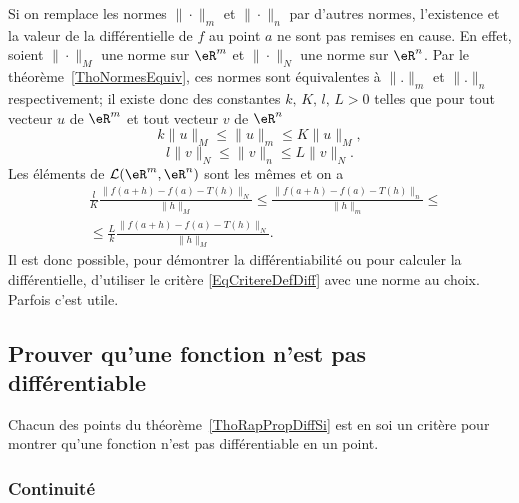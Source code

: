 \begin{remark}
	Si on remplace les normes \( \|\cdot\|_m\)  et \( \|\cdot\|_n\) par d'autres normes, l'existence et la valeur de la différentielle de \( f\) au point \( a\) ne sont pas remises en cause. En effet, soient  \( \|\cdot\|_M\)  une norme sur \( \eR^m\) et \( \|\cdot\|_N\) une norme sur \( \eR^n\). Par le théorème~\ref{ThoNormesEquiv}, ces normes sont équivalentes à \( \| . \|_m\) et \( \| . \|_n\) respectivement; il existe donc des constantes \( k,\, K,\, l,\,L >0\) telles que  pour tout vecteur \( u\) de \( \eR^m\) et tout vecteur \( v\) de \( \eR^n\)
	\[
		k\|u\|_M\leq \|u\|_m\leq K\|u\|_M,
	\]
	\[
		l\|v\|_N\leq \|v\|_n\leq L\|v\|_N.
	\]
	Les éléments de \( \mathcal{L}(\eR^m, \eR^n)\) sont les mêmes et on a
	\begin{equation}
		\begin{aligned}
			 & \frac{l}{K}  \frac{\|f(a+h)-f(a)-T(h)\|_N}{\|h\|_M}\leq \frac{\|f(a+h)-f(a)-T(h)\|_n}{\|h\|_m}\leq \\
			 & \leq\frac{L}{k} \frac{\|f(a+h)-f(a)-T(h)\|_N}{\|h\|_M}.
		\end{aligned}
	\end{equation}
	Il est donc possible, pour démontrer la différentiabilité ou pour calculer la différentielle, d'utiliser le critère \eqref{EqCritereDefDiff} avec une norme au choix. Parfois c'est utile.
\end{remark}

\subsection{Prouver qu'une fonction n'est pas différentiable}

Chacun des points du théorème~\ref{ThoRapPropDiffSi} est en soi un critère pour montrer qu'une fonction n'est pas différentiable en un point.

\subsubsection{Continuité}


